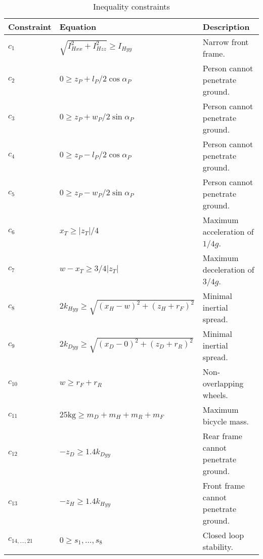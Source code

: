 \documentclass{bmd2019a}
\begin{document}
\begin{table}
  \caption{Inequality constraints}
  \begin{tabular}{lll}
    \toprule
    Constraint & Equation & Description \\
    \midrule
    $c_1$    & $\sqrt{I_{Hxx}^2+I_{Hzz}^2} \geq I_{Hyy}$           & Narrow front frame. \\
    $c_2$    & $0 \geq z_P + l_P/2 \cos{\alpha_P}$                 & Person cannot penetrate ground. \\
    $c_3$    & $0 \geq z_P + w_P/2 \sin{\alpha_P}$                 & Person cannot penetrate ground. \\
    $c_4$    & $0 \geq z_P - l_P/2 \cos{\alpha_P}$                 & Person cannot penetrate ground. \\
    $c_5$    & $0 \geq z_P - w_P/2 \sin{\alpha_P}$                 & Person cannot penetrate ground. \\
    $c_6$    & $x_T \geq |z_T|/4$                                  & Maximum acceleration of $1/4g$. \\
    $c_7$    & $w-x_T \geq 3/4|z_T|$                               & Maximum deceleration of $3/4g$. \\
    $c_8$    & $2k_{Hyy} \geq \sqrt{(x_H - w)^2 + (z_H + r_F)^2}$  & Minimal inertial spread. \\
    $c_9$    & $2k_{Dyy} \geq \sqrt{(x_D - 0)^2 + (z_D + r_R)^2}$  & Minimal inertial spread. \\
    $c_{10}$ & $w \geq r_F +r_R$                                   & Non-overlapping wheels. \\
    $c_{11}$ & $25\si{\kg} \geq m_D + m_H + m_R + m_F$             & Maximum bicycle mass. \\
    $c_{12}$ & $-z_D \geq 1.4 k_{Dyy}$                             & Rear frame cannot penetrate ground. \\
    $c_{13}$ & $-z_H \geq 1.4 k_{Hyy}$                             & Front frame cannot penetrate ground. \\
    $c_{14,\ldots,21}$ & $0 \geq s_1,\ldots,s_8$                   & Closed loop stability. \\
    \bottomrule
  \end{tabular}
\end{table}
\end{document}
